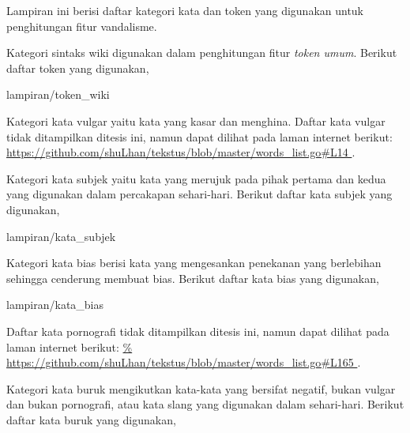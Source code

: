 	\label{lampiran:daftar_token_dan_kata}

Lampiran ini berisi daftar kategori kata dan token yang digunakan untuk
penghitungan fitur vandalisme.

	\label{lampiran:words_wiki_token}

Kategori sintaks wiki digunakan dalam penghitungan fitur \textit{token umum}.
Berikut daftar token yang digunakan,

	
		{lampiran/token_wiki}

\label{lampiran:words_vulgar}

Kategori kata vulgar yaitu kata yang kasar dan menghina.
Daftar kata vulgar tidak ditampilkan ditesis ini, namun dapat dilihat pada
laman internet berikut:
\url{
https://github.com/shuLhan/tekstus/blob/master/words_list.go#L14
}.

\label{lampiran:words_pronoun}

Kategori kata subjek yaitu kata yang merujuk pada pihak pertama dan kedua yang
digunakan dalam percakapan sehari-hari.
Berikut daftar kata subjek yang digunakan,

	
		{lampiran/kata_subjek}

\label{lampiran:words_bias}

Kategori kata bias berisi kata yang mengesankan penekanan yang berlebihan
sehingga cenderung membuat bias.
Berikut daftar kata bias yang digunakan,

	
		{lampiran/kata_bias}

\label{lampiran:words_sex}

Daftar kata pornografi tidak ditampilkan ditesis ini, namun dapat dilihat pada
laman internet berikut:
\url{%
https://github.com/shuLhan/tekstus/blob/master/words_list.go#L165
}.

\label{lampiran:words_bad}

Kategori kata buruk mengikutkan kata-kata yang bersifat negatif, bukan vulgar
dan bukan pornografi, atau kata slang yang digunakan dalam sehari-hari.
Berikut daftar kata buruk yang digunakan,

